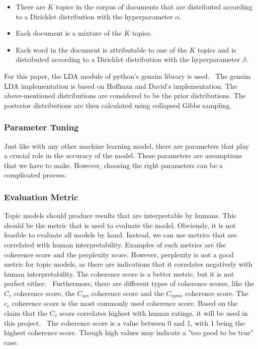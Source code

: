 \begin{itemize}
    \item There are $K$ topics in the corpus of documents that are distributed according to a Dirichlet distribution with the hyperparameter $\alpha$.
    \item Each document is a mixture of the $K$ topics.
    \item Each word in the document is attributable to one of the $K$ topics and is distributed according to a Dirichlet distribution with the hyperparameter $\beta$.
\end{itemize}

For this paper, the LDA module of python's gensim library is used.~\cite{rehurek_lrec} The gensim LDA implementation is based on Hoffman and David's implementation. The above-mentioned distributions are considered to be the prior distributions. The posterior distributions are then calculated using collapsed Gibbs sampling.

\subsubsection{Parameter Tuning}

Just like with any other machine learning model, there are parameters that play a crucial role in the accuracy of the model. These parameters are assumptions that we have to make. However, choosing the right parameters can be a complicated process.

\subsubsection*{Evaluation Metric}

Topic models should produce results that are interpretable by humans. This should be the metric that is used to evaluate the model. Obviously, it is not feasible to evaluate all models by hand. Instead, we can use metrics that are correlated with human interpretability. Examples of such metrics are the coherence score and the perplexity score. However, perplexity is not a good metric for topic models, as there are indications that it correlates negatively with human interpretability. The coherence score is a better metric, but it is not perfect either.~\cite{egger2022topic} Furthermore, there are different types of coherence scores, like the $C_v$ coherence score, the $C_{uci}$ coherence score and the $C_{npmi}$ coherence score. The $c_v$ coherence score is the most commonly used coherence score. Based on the claim that the $C_v$ score correlates highest with human ratings, it will be used in this project.~\cite{roder2015exploring} The coherence score is a value between 0 and 1, with 1 being the highest coherence score. Though high values may indicate a "too good to be true" case.  %

